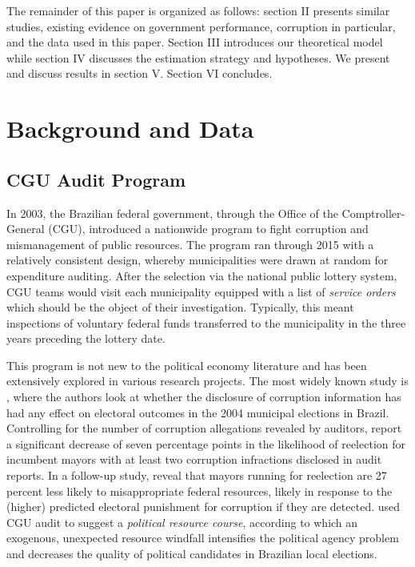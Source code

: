 \documentclass[11pt]{article}
\begin{document}
The remainder of this paper is organized as follows: section II presents similar studies, existing evidence on government performance, corruption in particular, and the data used in this paper. Section III introduces our theoretical model while section IV discusses the estimation strategy and hypotheses. We present and discuss results in section V. Section VI concludes.

\section{Background and Data} \label{sec:background}

\subsection{CGU Audit Program} \label{subsec:auditprogram}

In 2003, the Brazilian federal government, through the Office of the Comptroller-General (CGU), introduced a nationwide program to fight corruption and mismanagement of public resources. The program ran through 2015 with a relatively consistent design, whereby municipalities were drawn at random for expenditure auditing. After the selection via the national public lottery system, CGU teams would visit each municipality equipped with a list of \emph{service orders} which should be the object of their investigation. Typically, this meant inspections of voluntary federal funds transferred to the municipality in the three years preceding the lottery date.

This program is not new to the political economy literature and has been extensively explored in various research projects. The most widely known study is \citet{FerrazExposingCorruptPoliticians2008b}, where the authors look at whether the disclosure of corruption information has had any effect on electoral outcomes in the 2004 municipal elections in Brazil. Controlling for the number of corruption allegations revealed by auditors, \citet{FerrazExposingCorruptPoliticians2008b} report a significant decrease of seven percentage points in the likelihood of reelection for incumbent mayors with at least two corruption infractions disclosed in audit reports. In a follow-up study, \citet{FerrazElectoralAccountabilityCorruption2011a} reveal that mayors running for reelection are 27 percent less likely to misappropriate federal resources, likely in response to the (higher) predicted electoral punishment for corruption if they are detected. \citet{BrolloPoliticalResourceCurse2013} used CGU audit to suggest a \emph{political resource course}, according to which an exogenous, unexpected resource windfall intensifies the political agency problem and decreases the quality of political candidates in Brazilian local elections.
\end{document}
